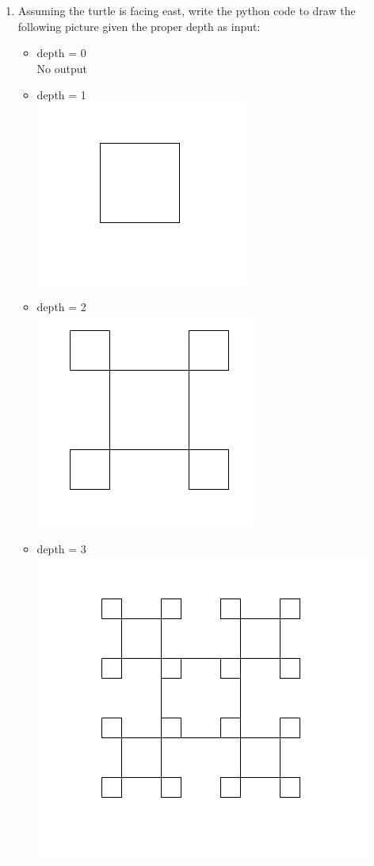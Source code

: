 \documentclass[11pt]{article}
\begin{document}
\begin{enumerate}
\begin{enumerate}
\end{enumerate}
\pagebreak
\item Assuming the turtle is facing east, write the python code to draw the following picture given the proper depth as input:
    \begin{itemize}
            \item depth = 0
           \\No output 
            \item depth = 1\\
            \includegraphics[scale=0.4]{1.png}
            \item depth = 2 \\
            \includegraphics[scale=0.4]{2.png}
            \item depth = 3\\
            \includegraphics[scale=0.4]{3.png}

\end{itemize}
\end{enumerate}
\end{document}
